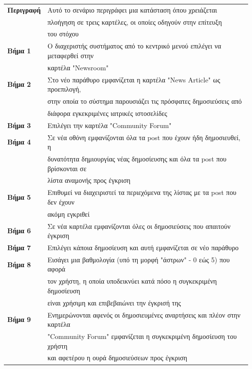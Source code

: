 \documentclass{article}
\newcommand\T{\rule{0pt}{2.6ex}}       %
\newcommand\B{\rule[-1.2ex]{0pt}{0pt}}
\begin{document}
  \begin{center}
     \begin{tabular}{|l|l|}
     \hline
      \textbf{Περιγραφή} & Αυτό το σενάριο περιγράφει μια κατάσταση όπου χρειάζεται \T \\& πλοήγηση σε τρεις καρτέλες, οι οποίες οδηγούν στην επίτευξη \\& του στόχου \B \\ 
      \hline
      \textbf{Βήμα 1} & Ο διαχεριστής συστήματος από το κεντρικό μενού επιλέγει να μεταφερθεί στην \T \\& καρτέλα "Newsroom" \T\B \\
      \hline
      \textbf{Βήμα 2} & Στο νέο παράθυρο εμφανίζεται η καρτέλα "News Article" ως προεπιλογή, \T \\& στην οποία το σύστημα παρουσιάζει τις πρόσφατες δημοσιεύσεις από \\& διάφορα εγκεκριμένες ιατρικές ιστοσελίδες \B \\
      \hline
      \textbf{Βήμα 3} & Επιλέγει την καρτέλα "Community Forum" \T\B \\
      \hline
      \textbf{Βήμα 4} & Σε νέα οθόνη εμφανίζονται όλα τα post που έχουν ήδη δημοσιευθεί, η \T \\&  δυνατότητα δημιουργίας νέας δημοσίευσης και όλα τα post που βρίσκονται σε \\& λίστα αναμονής προς έγκριση  \B \\
      \hline
      \textbf{Βήμα 5} & Επιθυμεί να διαχειριστεί τα περιεχόμενα της λίστας με τα post που δεν έχουν \T \\& ακόμη εγκριθεί \B \\
      \hline
      \textbf{Βήμα 6} & Σε νέα καρτέλα εμφανίζονται όλες οι δημοσιεύσεις που απαιτούν έγκριση \T\B \\
      \hline
      \textbf{Βήμα 7} & Επιλέγει κάποια δημοσίευση και αυτή εμφανίζεται σε νέο παράθυρο  \T\B \\
      \hline
      \textbf{Βήμα 8} & Εισάγει μια βαθμολογία (υπό τη μορφή "άστρων" - 0 εώς 5) που αφορά \T \\& τον χρήστη, η οποία υποδεικνύει κατά πόσο η συγκεκριμένη δημοσίευση \\& είναι χρήσιμη και επιβεβαιώνει την έγκρισή της \B \\
      \hline
      \textbf{Βήμα 9} & Ενημερώνονται αφενός οι δημοσιευμένες αναρτήσεις και πλέον στην καρτέλα \T \\&  "Community Forum" εμφανίζεται η συγκεκριμένη δημοσίευση του χρήστη \\&  και αφετέρου η ουρά δημοσιεύσεων προς έγκριση\B \\
      \hline
     \end{tabular}
 \end{center}
 
\end{document}
